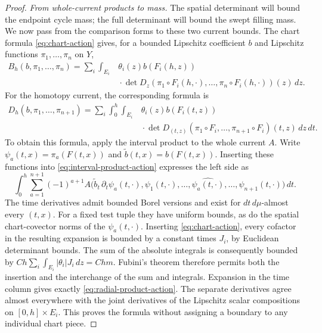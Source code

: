 \documentclass[11pt]{article}
\numberwithin{equation}{section}
\theoremstyle{definition}
\theoremstyle{remark}
\begin{document}
\begin{proof}
\emph{From whole-current products to mass.}
The spatial determinant will bound the endpoint cycle mass; the full
determinant will bound the swept filling mass. We now pass from the
comparison forms to these two current bounds. The chart formula
\eqref{eq:chart-action} gives, for a bounded Lipschitz coefficient $b$
and Lipschitz functions
$\pi_1,\ldots,\pi_n$ on $Y$,
\begin{equation}
 \begin{split}
 B_h(b,\pi_1,\ldots,\pi_n)
 =\sum_i\int_{E_i}&\theta_i(z)b(F_i(h,z))\\[-2pt]
       &{}\cdot\det D_z(\pi_1\circ F_i(h,\cdot),\ldots,
                 \pi_n\circ F_i(h,\cdot))(z)\,d z.
 \end{split}
 \label{eq:radial-pushforward-action}
\end{equation}
For the homotopy current, the corresponding formula is
\begin{equation}
 \begin{split}
 D_h(b,\pi_1,\ldots,\pi_{n+1})
 =\sum_i\int_0^h\int_{E_i}
       &\theta_i(z)b(F_i(t,z))\\[-2pt]
       &{}\cdot\det D_{(t,z)}
          (\pi_1\circ F_i,\ldots,\pi_{n+1}\circ F_i)(t,z)
          \,d z\,d t.
 \end{split}
 \label{eq:radial-product-action}
\end{equation}
To obtain this formula, apply the interval product to the whole
current $A$. Write $\psi_a(t,x)=\pi_a(F(t,x))$ and
$\widetilde b(t,x)=b(F(t,x))$.  Inserting these functions into
\eqref{eq:interval-product-action} expresses the left side as
\[
 \int_0^h\sum_{a=1}^{n+1}(-1)^{a+1}
 A\bigl(\widetilde b_t\,\partial_t\psi_a(t,\cdot),
   \psi_1(t,\cdot),\ldots,\widehat{\psi_a(t,\cdot)},\ldots,
   \psi_{n+1}(t,\cdot)\bigr)\,d t.
\]
The time derivatives admit bounded Borel versions and exist for
$dt\,d\mu$-almost every $(t,x)$.  For a fixed test tuple they have
uniform bounds, as do the spatial chart-covector norms of the
$\psi_a(t,\cdot)$.  Inserting \eqref{eq:chart-action}, every
cofactor in the resulting expansion is bounded by a constant
times $J_i$, by Euclidean determinant bounds.  The sum of the
absolute integrals is consequently bounded by
$C h\sum_i\int_{E_i}|\theta_i|J_i\,d z=C h m$.
Fubini's theorem therefore permits both the insertion and the
interchange of the sum and integrals.  Expansion in the time
column gives exactly \eqref{eq:radial-product-action}.
The separate derivatives agree almost everywhere with the joint
derivatives of the Lipschitz scalar compositions on
$[0,h]\times E_i$.  This proves the formula without assigning a
boundary to any individual chart piece.


\end{proof}
\end{document}
